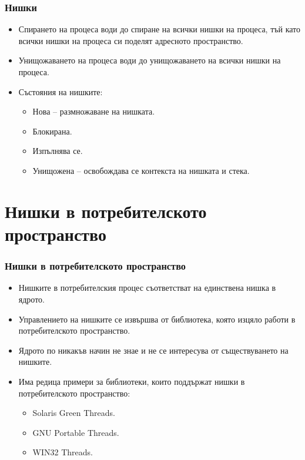 \documentclass[ignorenonframetext, hyperref=unicode]{beamer}
\begin{document}
\begin{frame}\frametitle{Нишки}
\begin{itemize}
\item Спирането на процеса води до спиране на всички нишки на процеса, тъй като
всички нишки на процеса си поделят адресното пространство.
\item Унищожаването на процеса води до унищожаването на всички нишки на процеса.
\item Състояния на нишките:
\begin{itemize}
  \item Нова -- размножаване на нишката.
  \item Блокирана.
  \item Изпълнява се.
  \item Унищожена -- освобождава се контекста на нишката и стека.
\end{itemize}
\end{itemize}
\end{frame}

\section{Нишки в потребителското пространство}

\begin{frame}\frametitle{Нишки в потребителското пространство}
\begin{itemize}
\item Нишките в потребителския процес съответстват на единствена нишка в ядрото.
\item Управлението на нишките се извършва от библиотека, която  изцяло работи в
потребителското пространство.
\item Ядрото по никакъв начин не знае и не се интересува от съществуването на
нишките.
\item Има редица примери за библиотеки, които поддържат нишки в потребителското
пространство:
\begin{itemize}
  \item Solaris Green Threads.
  \item GNU Portable Threads.
  \item WIN32 Threads.
\end{itemize}
\end{itemize}
\end{frame}
\end{document}
